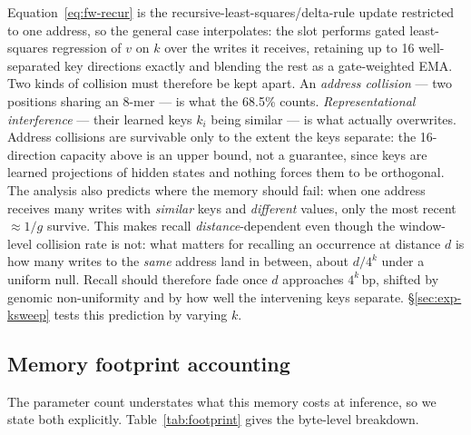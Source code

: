 \documentclass[11pt]{article}
\theoremstyle{plain}
\begin{document}
Equation~\ref{eq:fw-recur} is the recursive-least-squares/delta-rule update restricted to one
address, so the general case interpolates: the slot performs gated least-squares regression of
$v$ on $k$ over the writes it receives, retaining up to 16 well-separated key directions exactly
and blending the rest as a gate-weighted EMA. Two kinds of collision must therefore be kept apart. An \emph{address collision} --- two
positions sharing an 8-mer --- is what the 68.5\% counts. \emph{Representational interference}
--- their learned keys $k_i$ being similar --- is what actually overwrites. Address collisions
are survivable only to the extent the keys separate: the 16-direction capacity above is an upper
bound, not a guarantee, since keys are learned projections of hidden states and nothing forces
them to be orthogonal. The analysis also predicts where the memory should fail: when one address
receives many writes with \emph{similar} keys and \emph{different} values, only the most recent
$\approx 1/g$ survive. This makes recall \emph{distance}-dependent even though the window-level
collision rate is not: what matters for recalling an occurrence at distance $d$ is how many
writes to the \emph{same} address land in between, about $d/4^k$ under a uniform null. Recall
should therefore fade once $d$ approaches $4^k$\,bp, shifted by genomic non-uniformity and by
how well the intervening keys separate. \S\ref{sec:exp-ksweep} tests this prediction by
varying $k$.

\subsection{Memory footprint accounting}\label{sec:method-footprint}

The parameter count understates what this memory costs at inference, so we state both explicitly.
Table~\ref{tab:footprint} gives the byte-level breakdown.
\end{document}
